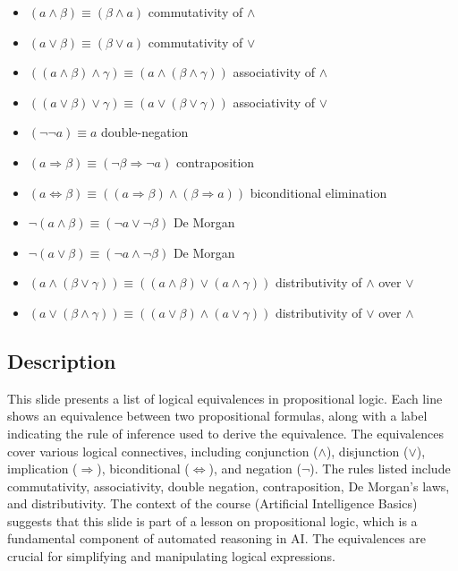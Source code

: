 \documentclass{article}%
\begin{document}
\begin{itemize}
    \item $(a \land \beta) \equiv (\beta \land a)$ \quad commutativity of $\land$
    \item $(a \lor \beta) \equiv (\beta \lor a)$ \quad commutativity of $\lor$
    \item $((a \land \beta) \land \gamma) \equiv (a \land (\beta \land \gamma))$ \quad associativity of $\land$
    \item $((a \lor \beta) \lor \gamma) \equiv (a \lor (\beta \lor \gamma))$ \quad associativity of $\lor$
    \item $(\neg \neg a) \equiv a$ \quad double-negation
    \item $(a \Rightarrow \beta) \equiv (\neg \beta \Rightarrow \neg a)$ \quad contraposition
    \item $(a \Leftrightarrow \beta) \equiv ((a \Rightarrow \beta) \land (\beta \Rightarrow a))$ \quad biconditional elimination
    \item $\neg (a \land \beta) \equiv (\neg a \lor \neg \beta)$ \quad De Morgan
    \item $\neg (a \lor \beta) \equiv (\neg a \land \neg \beta)$ \quad De Morgan
    \item $(a \land (\beta \lor \gamma)) \equiv ((a \land \beta) \lor (a \land \gamma))$ \quad distributivity of $\land$ over $\lor$
    \item $(a \lor (\beta \land \gamma)) \equiv ((a \lor \beta) \land (a \lor \gamma))$ \quad distributivity of $\lor$ over $\land$
\end{itemize}
%
\subsection{Description}%
This slide presents a list of logical equivalences in propositional logic.  Each line shows an equivalence between two propositional formulas, along with a label indicating the rule of inference used to derive the equivalence.  The equivalences cover various logical connectives, including conjunction ($\land$), disjunction ($\lor$), implication ($\Rightarrow$), biconditional ($\Leftrightarrow$), and negation ($\neg$).  The rules listed include commutativity, associativity, double negation, contraposition, De Morgan's laws, and distributivity.  The context of the course (Artificial Intelligence Basics) suggests that this slide is part of a lesson on propositional logic, which is a fundamental component of automated reasoning in AI.  The equivalences are crucial for simplifying and manipulating logical expressions.%
\end{document}
